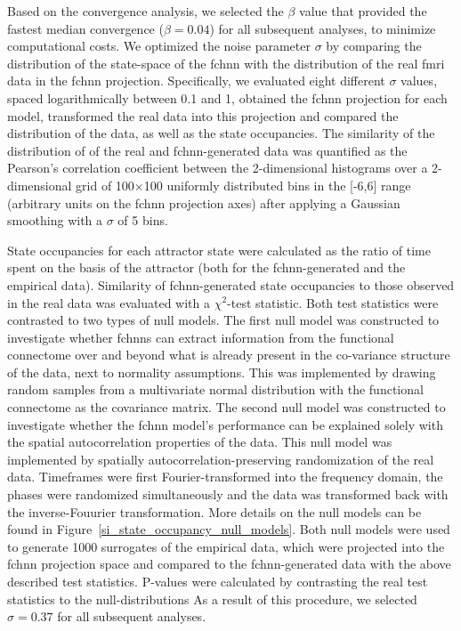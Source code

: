 \documentclass{article}
\begin{document}
Based on the convergence analysis, we selected the $\beta$ value that provided the fastest median convergence ($\beta = 0.04$) for all subsequent analyses, to minimize computational costs. We optimized the noise parameter $\sigma$ by comparing the distribution of the state-space of the \acrshort{fchnn} with the distribution of the real \acrshort{fmri} data in the \acrshort{fchnn} projection. Specifically, we evaluated eight different $\sigma$ values, spaced logarithmically between 0.1 and 1, obtained the \acrshort{fchnn} projection for each model, transformed the real data into this projection and compared the distribution of the data, as well as the state occupancies. The similarity of the distribution of of the real and \acrshort{fchnn}-generated data was quantified as the Pearson's correlation coefficient between the 2-dimensional histograms over a 2-dimensional grid of 100$\times$100 uniformly distributed bins in the [-6,6] range (arbitrary units on the \acrshort{fchnn} projection axes) after applying a Gaussian smoothing with a $\sigma$ of 5 bins.

State occupancies for each attractor state were calculated as the ratio of time spent on the basis of the attractor (both for the \acrshort{fchnn}-generated and the empirical data). Similarity of \acrshort{fchnn}-generated state occupancies to those observed in the real data was evaluated with a $\chi^2$-test statistic.
Both test statistics were contrasted to two types of null models. The first null model was constructed to investigate whether \acrshort{fchnn}s can extract information from the functional connectome over and beyond what is already present in the co-variance structure of the data, next to normality assumptions. This was implemented by drawing random samples from a multivariate normal distribution with the functional connectome as the covariance matrix. The second null model was constructed to investigate whether the \acrshort{fchnn} model's performance can be explained solely with the spatial autocorrelation properties of the data. This null model was implemented by spatially autocorrelation-preserving randomization of the real data. Timeframes were first Fourier-transformed into the frequency domain, the phases were randomized simultaneously and the data was transformed back with the inverse-Fouurier transformation. More details on the null models can be found in Figure~\ref{si_state_occupancy_null_models}.
Both null models were used to generate 1000 surrogates of the empirical data, which were projected into the \acrshort{fchnn} projection space and compared to the \acrshort{fchnn}-generated data with the above described test statistics. P-values were calculated by contrasting the real test statistics to the null-distributions
As a result of this procedure, we selected $\sigma = 0.37$ for all subsequent analyses.
\end{document}
